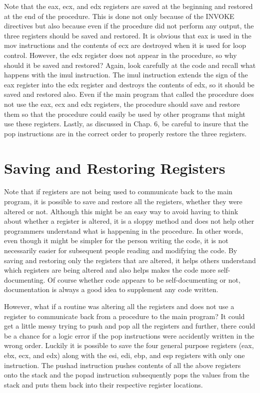 \documentclass[10pt]{book}
\begin{document}
Note that the eax, ecx, and edx registers are saved at the beginning and restored at the end of the procedure. This is done not only because of the INVOKE directives but also because even if the procedure did not perform any output, the three registers should be saved and restored. It is obvious that eax is used in the mov instructions and the contents of ecx are destroyed when it is used for loop control. However, the edx register does not appear in the procedure, so why should it be saved and restored? Again, look carefully at the code and recall what happens with the imul instruction. The imul instruction extends the sign of the eax register into the edx register and destroys the contents of edx, so it should be saved and restored also. Even if the main program that called the procedure does not use the eax, ecx and edx registers, the procedure should save and restore them so that the procedure could easily be used by other programs that might use these registers. Lastly, as discussed in Chap. 6, be careful to insure that the pop instructions are in the correct order to properly restore the three registers.

\section{Saving and Restoring Registers}
Note that if registers are not being used to communicate back to the main program, it is possible to save and restore all the registers, whether they were altered or not. Although this might be an easy way to avoid having to think about whether a register is altered, it is a sloppy method and does not help other programmers understand what is happening in the procedure. In other words, even though it might be simpler for the person writing the code, it is not necessarily easier for subsequent people reading and modifying the code. By saving and restoring only the registers that are altered, it helps others understand which registers are being altered and also helps makes the code more self-documenting. Of course whether code appears to be self-documenting or not, documentation is always a good idea to supplement any code written.

However, what if a routine was altering all the registers and does not use a register to communicate back from a procedure to the main program? It could get a little messy trying to push and pop all the registers and further, there could be a chance for a logic error if the pop instructions were accidently written in the wrong order. Luckily it is possible to save the four general purpose registers (eax, ebx, ecx, and edx) along with the esi, edi, ebp, and esp registers with only one instruction. The pushad instruction pushes contents of all the above registers onto the stack and the popad instruction subsequently pops the values from the stack and puts them back into their respective register locations.
\end{document}
